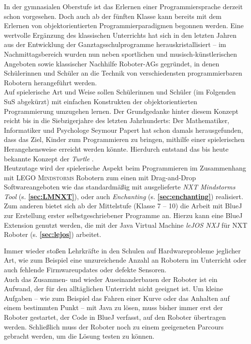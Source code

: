 \documentclass[paper=a4, pagesize, DIV=calc, BCOR=15mm, twoside=on, onecolumn=on, open = right, titlepage =on, parskip =half-, headsepline = on, footsepline = on, chapterprefix = on, appendixprefix = off, fontsize = 12pt, numbers = noenddot, abstract = on]{scrbook}
\numberwithin{equation}{chapter}
\theoremstyle{definition}
\theoremstyle{plain}
\theoremstyle{plain}
\theoremstyle{remark}
\theoremstyle{plain}
\theoremstyle{plain}
\begin{document}
In der gymnasialen Oberstufe ist das Erlernen einer Programmiersprache derzeit schon vorgesehen. Doch auch ab der fünften Klasse kann bereits mit dem Erlernen von objektorientierten Programmierparadigmen begonnen werden. Eine wertvolle Ergänzung des klassischen Unterrichts hat sich in den letzten Jahren aus der Entwicklung der Ganztagsschulprogramme herauskristallisiert -- im Nachmittagsbereich wurden nun neben sportlichen und musisch-künstlerischen Angeboten sowie klassischer Nachhilfe Roboter-AGs gegründet, in denen Schülerinnen und Schüler an die Technik von verschiedensten programmierbaren Robotern herangeführt werden.\\
Auf spielerische Art und Weise sollen Schülerinnen und Schüler (im Folgenden SuS abgekürzt) mit einfachen Konstrukten der objektorientierten Programmierung umzugehen lernen. Der Grundgedanke hinter diesem Konzept reicht bis in die Siebzigerjahre des letzten Jahrhunderts: Der Mathematiker, Informatiker und Psychologe Seymour Papert hat schon damals herausgefunden, dass das Ziel, Kinder zum Programmieren zu bringen, mithilfe einer spielerischen Herangehensweise erreicht werden könnte. Hierdurch entstand das bis heute bekannte Konzept der \emph{Turtle} \cite[S.365]{nievergelt:99}.\\
Heutzutage wird der spielerische Aspekt beim Programmieren im Zusammenhang mit \textsc{LEGO Mindstorms} Robotern zum einen mit Drag-and-Drop Softwareangeboten wie das standardmäßig mit ausgelieferte \emph{NXT Mindstorms Tool} (s.  \textbf{\ref{sec:LMNXT}}), oder auch \emph{Enchanting} (s. \textbf{\ref{sec:enchanting}}) realisiert. Zum anderen bietet sich ab der Mittelstufe (Klasse 7 -- 10) die Arbeit mit BlueJ zur Erstellung erster selbstgeschriebener Programme an. Hierzu kann eine BlueJ Extension genutzt werden, die mit der Java Virtual Machine \emph{leJOS NXJ} für NXT Roboter (s. \textbf{\ref{sec:lejos}}) arbeitet.

Immer wieder stoßen Lehrkräfte in den Schulen auf Hardwareprobleme jeglicher Art, wie zum Beispiel eine unzureichende Anzahl an Robotern im Unterricht oder auch fehlende Firmwareupdates oder defekte Sensoren.\\
Auch das Zusammen- und wieder Auseinanderbauen der Roboter ist ein Aufwand, der für den alltäglichen Unterricht nicht geeignet ist. Um kleine Aufgaben -- wie zum Beispiel das Fahren einer Kurve oder das Anhalten auf einem bestimmten Punkt -- mit Java zu lösen, muss bisher immer erst der Roboter gestartet, der Code in BlueJ verfasst, auf den Roboter übertragen werden. Schließlich muss der Roboter noch zu einem geeigeneten Parcours gebracht werden, um die Lösung testen zu können.
\end{document}
